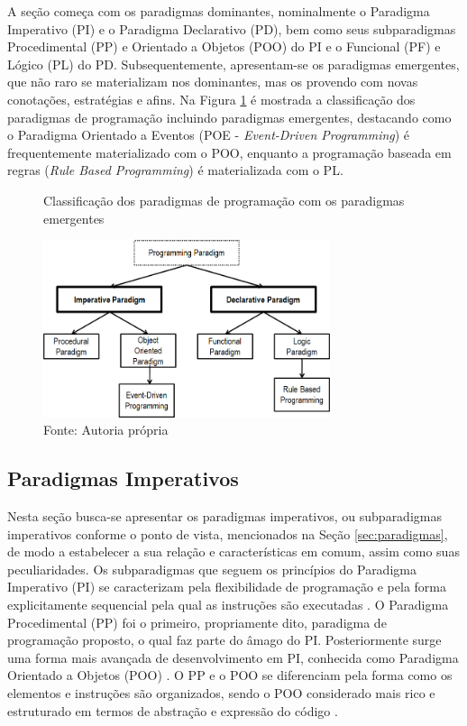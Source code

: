 A seção começa com os paradigmas dominantes, nominalmente o Paradigma Imperativo
(PI) e o Paradigma Declarativo (PD), bem como seus subparadigmas Procedimental
(PP) e Orientado a Objetos (POO) do PI e o Funcional (PF) e Lógico (PL) do PD.
Subsequentemente, apresentam-se os paradigmas emergentes, que não raro se
materializam nos dominantes, mas os provendo com novas conotações, estratégias e
afins. Na Figura \ref{fig:paradigmas_simao} é mostrada a classificação dos
paradigmas de programação incluindo paradigmas emergentes, destacando como o
Paradigma Orientado a Eventos (POE - \textit{Event-Driven Programming}) é
frequentemente materializado com o POO, enquanto a programação baseada em regras
(\textit{Rule Based Programming}) é materializada com o PL.

\begin{figure}[!htb]
  \centering
  \caption{Classificação dos paradigmas de programação com os paradigmas emergentes}
  \includegraphics[width=0.75\textwidth]{../figures/paradimas_simao.png}
  \caption*{Fonte: Autoria própria}
  \label{fig:paradigmas_simao}
\end{figure}

\subsection{Paradigmas Imperativos}\label{sec:imperativos}

Nesta seção busca-se apresentar os paradigmas imperativos, ou subparadigmas
imperativos conforme o ponto de vista, mencionados na Seção
\ref{sec:paradigmas}, de modo a estabelecer a sua relação e características em
comum, assim como suas peculiaridades. Os subparadigmas que seguem os princípios
do Paradigma Imperativo (PI) se caracterizam pela flexibilidade de programação e
pela forma explicitamente sequencial pela qual as instruções são executadas
\cite{msc_Banaszewski_2009}. O Paradigma Procedimental (PP) foi o primeiro,
propriamente dito, paradigma de programação proposto, o qual faz parte do âmago
do PI. Posteriormente surge uma forma mais avançada de desenvolvimento em PI,
conhecida como Paradigma Orientado a Objetos (POO) \cite{msc_Banaszewski_2009}.
O PP e o POO se diferenciam pela forma como os elementos e instruções são
organizados, sendo o POO considerado mais rico e estruturado em termos de
abstração e expressão do código \cite{doc_ronszcka_2019}.

